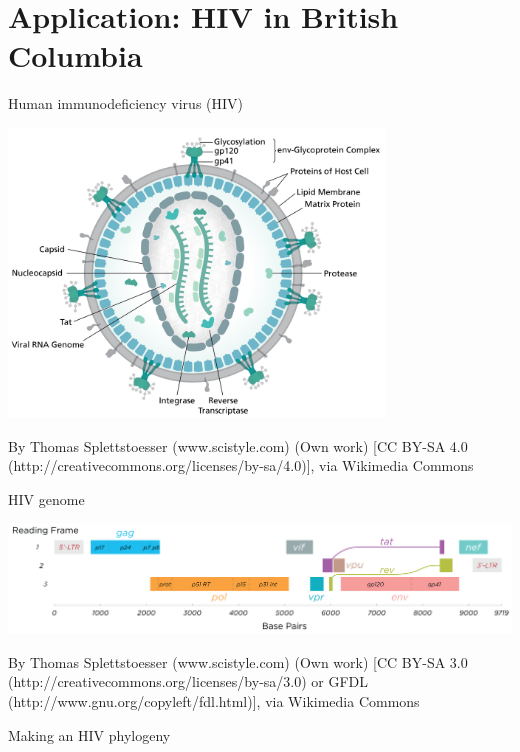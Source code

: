 \documentclass{beamer}
\begin{document}
\section{Application: HIV in British Columbia}

\begin{frame}{Human immunodeficiency virus (HIV)}
    \vspace{-0.5cm}
    \begin{center}
    \includegraphics[width=0.75\textwidth]{hiv-structure}
    \end{center}
    \tiny
    By Thomas Splettstoesser (www.scistyle.com) (Own work) [CC BY-SA 4.0
    (http://creativecommons.org/licenses/by-sa/4.0)], via Wikimedia Commons \par
\end{frame}

\begin{frame}{HIV genome}
    \vspace{1cm}

    \includegraphics[width=\textwidth]{hiv-genome}

    \vspace{2cm}
    \tiny
    By Thomas Splettstoesser (www.scistyle.com) (Own work) [CC BY-SA 3.0
    (http://creativecommons.org/licenses/by-sa/3.0) or GFDL
    (http://www.gnu.org/copyleft/fdl.html)], via Wikimedia Commons\par
\end{frame}

\begin{frame}{Making an HIV phylogeny}
    \begin{tikzpicture}

    \end{tikzpicture}
\end{frame}
\end{document}
